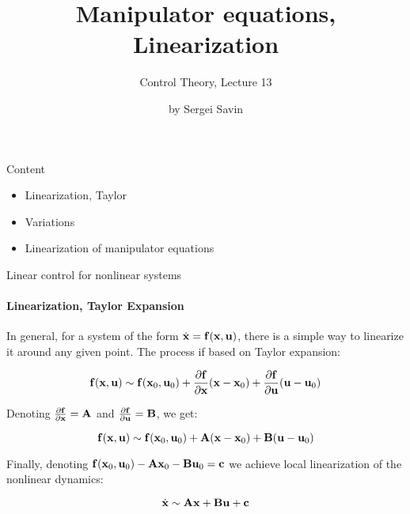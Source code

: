 \documentclass{beamer}
\title{Manipulator equations, Linearization}
\subtitle{Control Theory, Lecture 13}
\author{by Sergei Savin}
\date{\mydate}
\begin{document}
\maketitle


\begin{frame}{Content}
\begin{itemize}
\item Linearization, Taylor
\item Variations
\item Linearization of manipulator equations
\end{itemize}
\end{frame}






\begin{frame}{Linear control for nonlinear systems}
	\framesubtitle{Linearization, Taylor Expansion}
	\begin{flushleft}
		
		In general, for a system of the form $\dot{\mathbf{x}} = \mathbf{f}(\mathbf{x}, \mathbf{u})$, there is a simple way to linearize it around any given point. The process if based on Taylor expansion:
		
		\begin{equation}
			\mathbf{f}(\mathbf{x}, \mathbf{u}) 	\sim \mathbf{f}(\mathbf{x}_0, \mathbf{u}_0) +
			\frac{\partial \mathbf{f}}{\partial \mathbf{x}} (\mathbf{x} - \mathbf{x}_0) + 
			\frac{\partial \mathbf{f}}{\partial \mathbf{u}} (\mathbf{u} - \mathbf{u}_0)
		\end{equation}
		
		Denoting $\frac{\partial \mathbf{f}}{\partial \mathbf{x}} = \mathbf{A}$ and $\frac{\partial \mathbf{f}}{\partial \mathbf{u}} = \mathbf{B}$, we get:
		
		\begin{equation}
			\mathbf{f}(\mathbf{x}, \mathbf{u}) 	\sim \mathbf{f}(\mathbf{x}_0, \mathbf{u}_0) +
			\mathbf{A} (\mathbf{x} - \mathbf{x}_0) + 
			\mathbf{B} (\mathbf{u} - \mathbf{u}_0)
		\end{equation}
		
		Finally, denoting $ \mathbf{f}(\mathbf{x}_0, \mathbf{u}_0) - \mathbf{A}\mathbf{x}_0 - \mathbf{B} \mathbf{u}_0 = \mathbf{c}$ we achieve local linearization of the nonlinear dynamics:
		
		\begin{equation}
			\dot{\mathbf{x}} \sim \mathbf{A} \mathbf{x} + 
			\mathbf{B} \mathbf{u} + \mathbf{c}
		\end{equation}
		
		
	\end{flushleft}
\end{frame}
\end{document}
